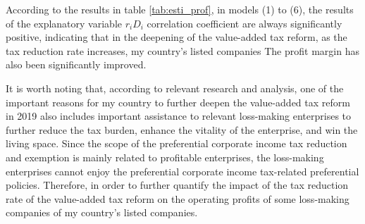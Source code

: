 \documentclass[3p,times]{elsarticle}
\begin{document}
According to the results in table \ref{tab:esti_prof}, in models (1) to (6), the results of the explanatory variable $r_i D_i$ correlation coefficient are always significantly positive, indicating that in the deepening of the value-added tax reform, as the tax reduction rate increases, my country’s listed companies The profit margin has also been significantly improved.



It is worth noting that, according to relevant research and analysis, one of the important reasons for my country to further deepen the value-added tax reform in 2019 also includes important assistance to relevant loss-making enterprises to further reduce the tax burden, enhance the vitality of the enterprise, and win the living space. Since the scope of the preferential corporate income tax reduction and exemption is mainly related to profitable enterprises, the loss-making enterprises cannot enjoy the preferential corporate income tax-related preferential policies. Therefore, in order to further quantify the impact of the tax reduction rate of the value-added tax reform on the operating profits of some loss-making companies of my country's listed companies.
\end{document}
